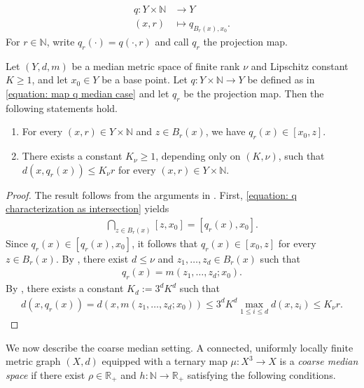 \documentclass[12pt,reqno]{amsart}
\newcommand{\N}{\mathbb{N}}
\newcommand{\R}{\mathbb{R}}
\numberwithin{equation}{section}
\begin{document}
\begin{equation}
    \label{equation: map q median case}
    \begin{aligned}
        q \colon Y\times \N &\longrightarrow Y \\
                (x,r) &\longmapsto q_{B_r(x),x_0}.
    \end{aligned}
\end{equation}
For $r\in\N$, write $q_r(\cdot)=q(\cdot,r)$ and call $q_r$ the projection map.
\begin{lemma}\label{lemma: distance of meets}
    Let $(Y,d,m)$ be a median metric space of finite rank $\nu$ and Lipschitz constant $K\ge 1$, and let $x_0\in Y$ be a base point. Let $q: Y\times \N\to Y$ be defined as in \eqref{equation: map q median case} and let $q_r$ be the projection map.
    Then the following statements hold.
    \begin{enumerate}
        \item For every $(x,r)\in Y\times \N$ and $z\in B_r(x)$, we have $q_r(x)\in [x_0,z]$.
        \item There exists a constant $K_{\nu}\ge 1$, depending only on $(K,\nu)$, such that $d(x,q_r(x))\le K_\nu r$ for every $(x,r)\in Y\times \N$.
    \end{enumerate}
\end{lemma}
\begin{proof}
    The result follows from the arguments in \cite[Section 5]{SpakulaWright2017propertyA}. First, \eqref{equation: q characterization as intersection} yields
    \begin{align*}
        \bigcap_{z\in B_r(x)} [z,x_0]=[q_r(x),x_0].
    \end{align*}
    Since $q_r(x)\in[q_r(x),x_0]$, it follows that $q_r(x)\in[x_0,z]$ for every $z\in B_r(x)$. By \cite[Lemma 5.3.iii]{SpakulaWright2017propertyA}, there exist $d\le \nu$ and $z_1,\ldots, z_d\in B_r(x)$ such that
    \begin{align*}
        q_r(x)=m(z_1,\ldots, z_d;x_0).
    \end{align*}
    By \cite[Proposition 5.5]{SpakulaWright2017propertyA}, there exists a constant $K_d:=3^dK^d$ such that
    \begin{align*}
        d(x,q_r(x))=d(x,m(z_1,\ldots, z_d;x_0)) \le 3^dK^d \max_{1\le i\le d}d(x,z_i)\le K_\nu r.
    \end{align*}
\end{proof}
We now describe the coarse median setting. A connected, uniformly locally finite metric graph $(X,d)$ equipped with a ternary map $\mu: X^3\to X$ is a \textit{coarse median space} if there exist $\rho\in\R_+$ and $h:\N\to\R_+$ satisfying the following conditions.
\end{document}

